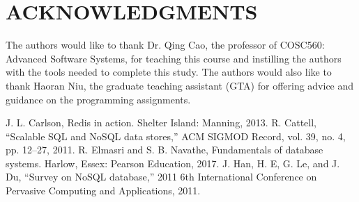 \documentclass[letterpaper, 10 pt, conference]{ieeeconf}
\begin{document}
\section*{ACKNOWLEDGMENTS}

The authors would like to thank Dr. Qing Cao, the professor of COSC560: Advanced Software Systems, for teaching this course and instilling the authors with the tools needed to complete this study. The authors would also like to thank Haoran Niu, the graduate teaching assistant (GTA) for offering advice and guidance on the programming assignments.








\begin{thebibliography}{99}

 J. L. Carlson, Redis in action. Shelter Island: Manning, 2013. 
 R. Cattell, “Scalable SQL and NoSQL data stores,” ACM SIGMOD Record, vol. 39, no. 4, pp. 12–27, 2011.
 R. Elmasri and S. B. Navathe, Fundamentals of database systems. Harlow, Essex: Pearson Education, 2017.
   J. Han, H. E, G. Le, and J. Du, “Survey on NoSQL database,” 2011 6th International Conference on Pervasive Computing and Applications, 2011.

\end{thebibliography}

 
\end{document}
